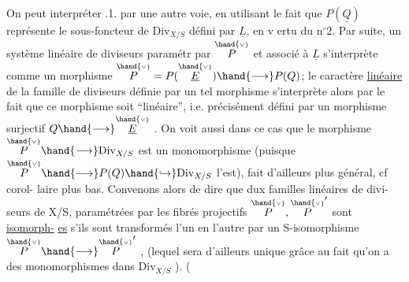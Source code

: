 On peut interpréter .1. par une autre voie, en utilisant le fait
que $P(\underline{Q})$ représente le  sous-foncteur de $\mathrm{Div}_{X/S}$ défini par
$\underline{L}$, en v ertu du n$^{\circ}$2. Par suite, un système linéaire de diviseurs paramétr
par $\overset{\hand{\scriptscriptstyle\vee}}{P}$ et associé à $\underline{L}$ s'interprète comme un morphisme $\overset{\hand{\scriptscriptstyle\vee}}{P} = P(\overset{\hand{\scriptscriptstyle\vee}}{\underline{E}})\hand{\longrightarrow} P(Q)$; le caractère
\uline{linéaire} de la famille de diviseurs définie par un tel morphisme
s'interprète alors par le fait que ce morphisme soit ``linéaire'', i.e.
précisément défini par un morphisme surjectif $Q\hand{\longrightarrow}\overset{\hand{\scriptscriptstyle\vee}}{\underline{E}}$ . \placedmargin{$\ulcorner$} On voit aussi
dans ce cas que le morphisme $\overset{\hand{\scriptscriptstyle\vee}}{P}\hand{\longrightarrow}\mathrm{Div}_{X/S}$ est un monomorphisme 
(puisque $\overset{\hand{\scriptscriptstyle\vee}}{P}\hand{\longrightarrow} P(Q)\hand{\hookrightarrow}\mathrm{Div}_{X/S}$ l'est), fait d'ailleurs plus général, cf corol-%
laire plus bas. Convenons alors de dire que dux familles linéaires de divi-%
seurs de X/S, paramétrées par les fibrés projectifs $\overset{\hand{\scriptscriptstyle\vee}}{P},\overset{\hand{\scriptscriptstyle\vee}}{P}'$ sont \uline{isomorph-}%
\uline{es} s'ils sont transformés l'un en l'autre par un S-isomorphisme $\overset{\hand{\scriptscriptstyle\vee}}{P}\hand{\longrightarrow}\overset{\hand{\scriptscriptstyle\vee}}{P}'$ ,
(lequel sera d'ailleurs unique grâce au fait qu'on a des monomorphismes
dans $\mathrm{Div}_{X/S}$ ). 
(

